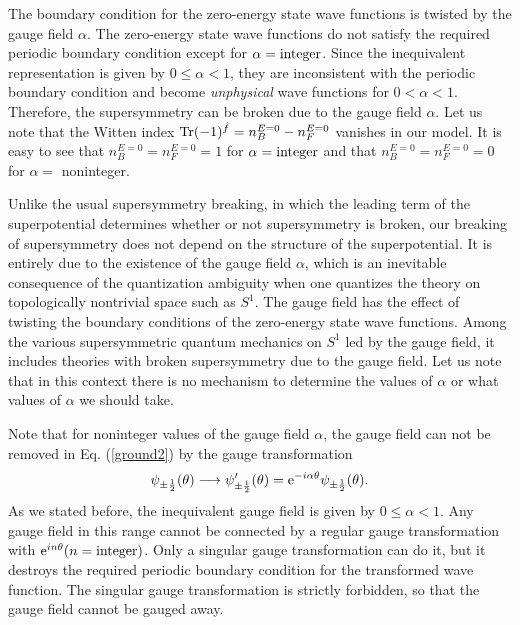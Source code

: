 \documentclass[a4paper,12pt]{article}
\begin{document}
The boundary condition for the zero-energy state 
wave functions is 
twisted by the gauge field $\alpha$.  
The zero-energy state wave functions do not satisfy the required periodic 
boundary condition except for $\alpha={\rm integer}$. Since the inequivalent
representation is given by $0\leq \alpha <1$, they 
are inconsistent with the periodic boundary condition and become 
{\it unphysical} wave functions for $0< \alpha < 1$.
Therefore, the supersymmetry can be broken due to the 
gauge field $\alpha$. Let us note that the 
Witten index ${\rm Tr}(-1)^{{\hat f}}=n_B^{E=0}-n_F^{E=0}$ vanishes 
in our model.  
It is easy to see that $n_B^{E=0}=n_F^{E=0}=1$ for $\alpha={\rm integer}$
and that $n_B^{E=0}=n_F^{E=0}=0$ for $\alpha=$ noninteger.
\par
Unlike the usual supersymmetry breaking, in which the leading term of the
superpotential determines whether or not supersymmetry is broken, our
breaking of supersymmetry does not 
depend on the structure of the superpotential. It is entirely 
due to the existence of the gauge field $\alpha$, which 
is an inevitable consequence of the quantization ambiguity 
when one quantizes the theory on topologically nontrivial 
space such as $S^1$. The gauge field has the effect of twisting the boundary 
conditions of the zero-energy state wave functions. 
Among the various supersymmetric quantum 
mechanics on $S^1$ led by the gauge field, it includes theories 
with broken supersymmetry due to the gauge field.
Let us note that in this context there is no mechanism to determine
the values of $\alpha$ or what values of $\alpha$ we should take. 
\par
Note that for noninteger values of the gauge field $\alpha$, the gauge 
field can not be 
removed in Eq. (\ref{ground2}) by the gauge transformation  
\begin{equation}
\psi_{\pm {1\over2}}(\theta)\longrightarrow 
\psi_{\pm {1\over2}}^{\prime}(\theta)={\rm e}^{-i\alpha\theta}\psi_{\pm {1\over2}}(\theta).
\label{gaugetrf}
\end{equation}
As we stated before, the inequivalent gauge field is given by
$0\leq \alpha < 1$. Any gauge field in this range cannot be connected by
a regular gauge transformation with ${\rm e}^{in\theta}(n={\rm integer})$. 
Only a singular gauge transformation can do it, but it destroys the required
periodic boundary condition for the transformed wave function.      
The singular gauge transformation is strictly 
forbidden, so that the gauge field cannot be gauged away.
\par
\end{document}

